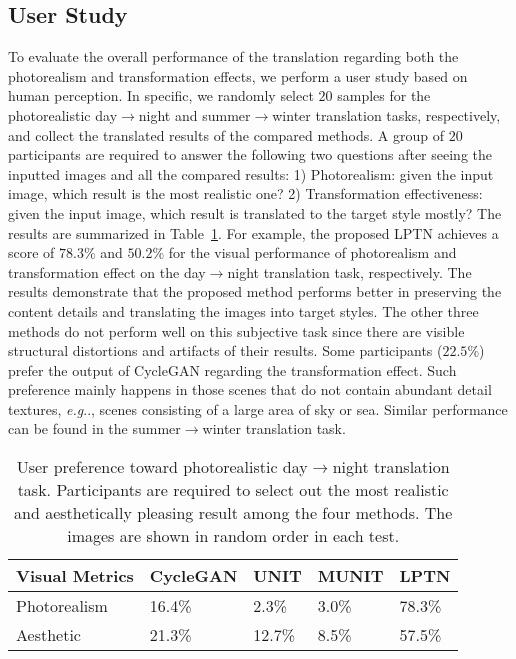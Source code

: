 \documentclass[10pt,twocolumn,letterpaper]{article}
\makeatletter
\DeclareRobustCommand\onedot{\futurelet\@let@token\@onedot}
\def\@onedot{\ifx\@let@token.\else.\null\fi\xspace}
\def\eg{\emph{e.g}\onedot} \def\Eg{\emph{E.g}\onedot}
\makeatother
\begin{document}
	\subsection{User Study}
	
	To evaluate the overall performance of the translation regarding both the photorealism and transformation effects, we perform a user study based on human perception. In specific, we randomly select $20$ samples for the photorealistic day$\rightarrow$night and summer$ \rightarrow $winter translation tasks, respectively, and collect the translated results of the compared methods. A group of $ 20 $ participants are required to answer the following two questions after seeing the inputted images and all the compared results: 1) Photorealism: given the input image, which result is the most realistic one? 2) Transformation effectiveness: given the input image, which result is translated to the target style mostly? The results are summarized in Table~\ref{user_study_I2I}. For example, the proposed LPTN achieves a score of $78.3\%$ and $50.2\%$ for the visual performance of photorealism and transformation effect on the day$\rightarrow$night translation task, respectively. The results demonstrate that the proposed method performs better in preserving the content details and translating the images into target styles. The other three methods do not perform well on this subjective task since there are visible structural distortions and artifacts of their results. Some participants ($22.5\%$) prefer the output of CycleGAN regarding the transformation effect. Such preference mainly happens in those scenes that do not contain abundant detail textures, \eg, scenes consisting of a large area of sky or sea. Similar performance can be found in the summer$ \rightarrow $winter translation task.
	
	
	\begin{table}[t]
		\caption{User preference toward photorealistic day$ \rightarrow $night translation task. Participants are required to select out the most realistic and aesthetically pleasing result among the four methods. The images are shown in random order in each test.
		}
		\small
		\vspace{-0.5em}
		\label{user_study_I2I}
		\begin{center}
			\begin{tabular}{p{1.9cm}p{1.3cm}<{\centering}p{0.9cm}<{\centering}p{1cm}<{\centering}p{0.8cm}<{\centering}}
				\toprule
				Visual Metrics&CycleGAN & UNIT & MUNIT & \textbf{LPTN}\\
				\midrule
				Photorealism&16.4\%&2.3\%&3.0\%&78.3\%\\
				Aesthetic&21.3\%&12.7\%&8.5\%&57.5\%\\
				\bottomrule
			\end{tabular}
		\end{center}
	\end{table}
	
\end{document}
